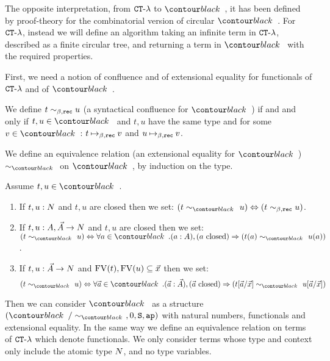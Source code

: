 The opposite interpretation, from ${ {\tt CT} \mbox{-} \lambda}$ to $\systemT$, it has been defined by proof-theory for the
combinatorial version of circular $\systemT$. For ${ {\tt CT} \mbox{-} \lambda}$, instead we will define an algorithm
taking an infinite term in  ${ {\tt CT} \mbox{-} \lambda}$, described as a finite circular tree, 
and returning a term in $\systemT$ with the required properties. 

First, we need a notion of confluence and of extensional equality 
for  functionals of ${ {\tt CT} \mbox{-} \lambda}$ and of $\systemT$.

We define $t \sim_{\beta,{\tt rec}} u$ (a syntactical confluence for $\systemT$) 
if and and only if $t, u \in \systemT$ and $t,u$ have the same type
and for some $v \in \systemT$: $t \mathbin{\mapsto}_{\beta,{\tt rec}} v$ and $u \mathbin{\mapsto}_{\beta,{\tt rec}} v$.

We define an equivalence relation (an extensional equality for $\systemT$) 
$\sim_{\systemT}$ on $\systemT$, by induction on the type. 


\begin{definition}
Assume $t,u \in \systemT$.
\begin{enumerate}
\item
If $t,u:{N}$ and $t,u$ are closed then we set: 
$(t \sim_{\systemT} u) \Leftrightarrow  (t \sim_{\beta,\rec} u)$.
\item
If $t,u:A,\vec{A}\rightarrow{N}$ and $t,u$ are closed then we set: 
$(t \sim_{\systemT} u) \Leftrightarrow  
\forall a \in \systemT. (a:A), (\mbox{$a$ closed}) \Rightarrow (t(a) \sim_{\systemT} u(a))$.
\item
If $t,u:\vec{A}\rightarrow{N}$ and ${{\rm FV}}(t), {{\rm FV}}(u) \subseteq \vec{x}$ then we set:
$$
(t \sim_{\systemT} u) 
\Leftrightarrow  
\forall \vec{a} \in \systemT. 
(\vec{a}:\vec{A}), (\mbox{$\vec{a}$ closed})  
\Rightarrow 
(t[\vec{a}/\vec{x}] \sim_{\systemT} u[\vec{a}/\vec{x}])
$$
\end{enumerate}
\end{definition}

Then we can consider $\systemT$ as a structure $(\systemT/\sim_{\systemT}, 0, \Succ, \ap)$
with natural numbers, functionals and extensional equality. 
In the same way we define an equivalence relation on terms of ${ {\tt CT} \mbox{-} \lambda}$ which denote functionals.
We only consider terms whose type and context only include the atomic type ${N}$, and no type variables. 


